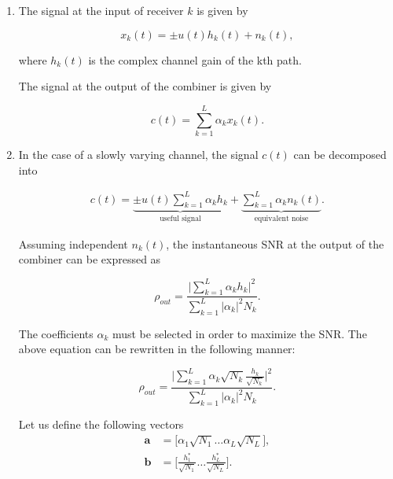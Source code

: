 \documentclass [a4paper, 11pt] {article}
\begin{document}
    \begin{solution}
        
            
        \begin{enumerate}
    \item The signal at the input of receiver $k$ is given by 
    
    \begin{equation}
        x_k(t) = \pm u(t) h_k(t) + n_k(t),
    \end{equation}
    
    where $h_k(t)$ is the complex channel gain of the kth path.
    
    The signal at the output of the combiner is given by 
    
    \begin{equation}
        c(t) = \sum_{k=1}^{L} \alpha_k x_k(t).
    \end{equation}
    
    \item In the case of a slowly varying channel, the signal $c(t)$ can be decomposed into 
    
    \begin{align}
        c(t) = \underbrace{\pm u(t) \sum_{k=1}^{L}\alpha_kh_k}_{\text{useful signal}} + \underbrace{\sum_{k=1}^{L}\alpha_k n_k(t)}_{\text{equivalent noise}}.
    \end{align}
    
    Assuming independent $n_k(t)$, the instantaneous SNR at the output of the combiner can be expressed as 
    
    \begin{equation}
        \rho_{out} = \dfrac{\Big| \sum_{k=1}^{L}\alpha_kh_k \Big|^2}{\sum_{k=1}^{L} |\alpha_k|^2N_k}.
    \end{equation}
    
    The coefficients $\alpha_k$ must be selected in order to maximize the SNR. The above equation can be rewritten in the following manner: 
    
        \begin{equation}
        \rho_{out} = \dfrac{\Big| \sum_{k=1}^{L}\alpha_k\sqrt{N_k} \frac{h_k}{\sqrt{N_k}} \Big|^2}{\sum_{k=1}^{L} |\alpha_k|^2N_k}.
        \end{equation}
    
    Let us define the following vectors 
    \begin{align}
        \mathbf{a} &= \Big[\alpha_1\sqrt{N_1} \hdots \alpha_L\sqrt{N_L}\Big], \\
        \mathbf{b} &= \bigg[\frac{h^*_1}{\sqrt{N_1}} \hdots \frac{h^*_L}{\sqrt{N_L}}\bigg].
    \end{align}
    

\end{enumerate}
\end{solution}
\end{document}
